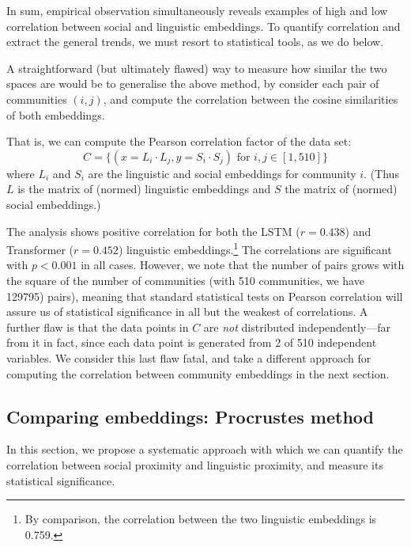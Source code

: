 \documentclass[11pt]{article}
\begin{document}
In sum, empirical observation simultaneously reveals examples of high
and low correlation between social and linguistic embeddings.  To
quantify correlation and extract the general trends, we must resort to
statistical tools, as we do below.

A straightforward (but ultimately flawed) way to measure how similar
the two spaces are would be to generalise the above method, by
consider each pair of communities \((i,j)\), and compute the
correlation between the cosine similarities of both embeddings.

That is, we can compute the Pearson correlation factor of the data set:
\[C = \{(x = L_i · L_j, y = S_i · S_j) \text {~for~} i,j ∈
  [1,510]\}\] %
where \(L_i\) and \(S_i\) are the linguistic and social embeddings for
community \(i\).  (Thus \(L\) is the matrix of (normed) linguistic
embeddings and \(S\) the matrix of (normed) social embeddings.)

The analysis shows positive correlation for both the LSTM ($r=0.438$)
and Transformer ($r=0.452$) linguistic embeddings.\footnote{ By
  comparison, the correlation between the two linguistic embeddings is
  \num{0.759}.}  The correlations are significant with $p<0.001$ in
all cases.  However, we note that the number of pairs grows with the
square of the number of communities (with 510 communities, we have
129795) pairs), meaning that standard statistical tests on Pearson
correlation will assure us of statistical significance in all but the
weakest of correlations. A further flaw is that the data points in
\(C\) are \emph{not} distributed independently---far from it in fact,
since each data point is generated from \num{2} of \num{510}
independent variables. We consider this last flaw fatal, and take a
different approach for computing the correlation between community
embeddings in the next section.


\subsection{Comparing embeddings: Procrustes method}
\label{sec:statistical-evidence}


In this section, we propose a
systematic approach with which we can quantify the correlation
between social proximity and linguistic proximity, and measure its
statistical significance.
\end{document}
